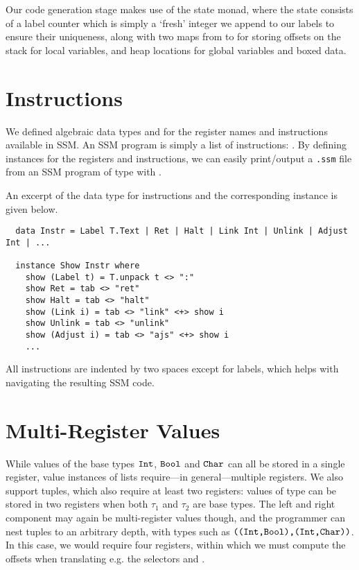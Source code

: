 Our code generation stage makes use of the state monad, where the state consists
of a label counter which is simply a `fresh' integer we append to our labels to
ensure their uniqueness, along with two maps from  to
 for storing offsets on the stack for local variables, and heap
locations for global variables and boxed data.


\section{Instructions}

We defined algebraic data types  and  for the
register names and instructions available in SSM. An SSM program is simply a
list of instructions: .
By defining  instances for the registers and instructions, we can
easily print/output a \verb|.ssm| file from an SSM program  of type
\haskell{[Instr]} with .

An excerpt of the data type for instructions and the corresponding 
instance is given below.

\begin{verbatim}
  data Instr = Label T.Text | Ret | Halt | Link Int | Unlink | Adjust Int | ...

  instance Show Instr where
    show (Label t) = T.unpack t <> ":"
    show Ret = tab <> "ret"
    show Halt = tab <> "halt"
    show (Link i) = tab <> "link" <+> show i
    show Unlink = tab <> "unlink"
    show (Adjust i) = tab <> "ajs" <+> show i
    ...
\end{verbatim}

All instructions are indented by two spaces except for labels, which helps with
navigating the resulting SSM code.



\section{Multi-Register Values}

While values of the base types $\texttt{Int}$, $\texttt{Bool}$ and $\texttt{Char}$ can all be
stored in a single register, value instances of lists
require---in general---multiple registers.
We also support tuples, which also require at least two registers:
values of type  can be stored in two registers
when both $\tau_1$ and $\tau_2$ are base types.
The left and right component may again be multi-register values though, and
the programmer can nest tuples to an arbitrary depth, with types such as
$\texttt{(}\texttt{(}\texttt{Int}\texttt{,}\texttt{Bool}\texttt{)}\texttt{,}\texttt{(}\texttt{Int}\texttt{,}\texttt{Char}\texttt{)}\texttt{)}$. In this case, we would
require four registers, within which we must compute the offsets when
translating e.g. the selectors  and .

